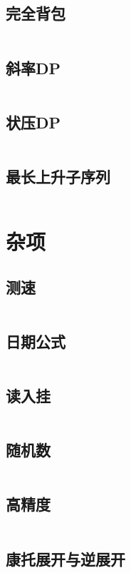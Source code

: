 \documentclass[UTF8]{ctexart}
\begin{document}
\subsection{完全背包}
\inputminted{cpp}{dp/完全背包.cpp}

\subsection{斜率DP}
\inputminted{cpp}{dp/斜率dp.cpp}

\subsection{状压DP}
\inputminted{cpp}{dp/状压dp.cpp}

\subsection{最长上升子序列}
\inputminted{cpp}{dp/最长上升子序列.cpp}

\section{杂项}

\subsection{测速}
\inputminted{cpp}{others/chrono.cpp}

\subsection{日期公式}
\inputminted{cpp}{others/date.cpp}

\subsection{读入挂}
\inputminted{cpp}{others/fread.cpp}

\subsection{随机数}
\inputminted{cpp}{others/随机数.cpp}

\subsection{高精度}
\inputminted{cpp}{others/高精度1.cpp}

\subsection{康托展开与逆展开}
\inputminted{cpp}{others/康托展开与康托逆展开.cpp}
\end{document}
